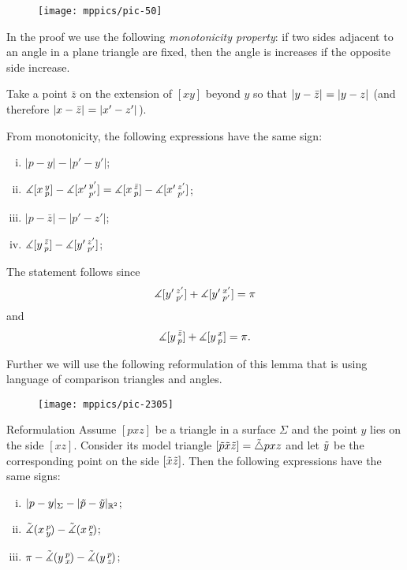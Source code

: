\begin{figure}[h!]
\vskip-0mm
\centering
\texttt{[image: mppics/pic-50]}
\vskip-0mm
\end{figure}

In the proof we use the following \emph{monotonicity property}:
if two sides adjacent to an angle in a plane triangle are fixed, 
then the angle is increases if the opposite side increase.

Take 
a point $\bar z$ on the extension of 
$[xy]$ beyond $y$ so that $\dist{y}{\bar z}{}=\dist{y}{z}{}$ (and therefore $\dist{x}{\bar z}{}=\dist{x'}{z'}{}$). 
 
From monotonicity, 
the following expressions have the same sign:
\begin{enumerate}[(i)]
\item $|p-y|-|p'-y'|$;
\item $\measuredangle\hinge{x}{y}{p}-\measuredangle\hinge{x'}{y'}{p'}=\measuredangle\hinge{x}{\bar z}{p}-\measuredangle\hinge{x'}{z'}{p'}$;
\item $|p-\bar z|-|p'-z'|$;
\item $\measuredangle\hinge{y}{\bar z}{p}-\measuredangle\hinge{y'}{z'}{p'}$;
\end{enumerate}
The statement follows since
\[\measuredangle\hinge{y'}{z'}{p'}+\measuredangle\hinge{y'}{x'}{p'}=\pi\]
and
\[\measuredangle\hinge{y}{\bar z}{p}+\measuredangle\hinge{y}{x}{p}=\pi.\]
\qedsf

Further we will use the following reformulation of this lemma that is using language of comparison triangles and angles.

\begin{wrapfigure}{r}{25mm}
\vskip-0mm
\centering
\texttt{[image: mppics/pic-2305]}
\end{wrapfigure}

\begin{thm}{Reformulation}\label{lem:alex-reformulation}
\label{lem:alex}
Assume $[pxz]$ be a triangle in a surface $\Sigma$ and 
the point $y$ lies on the side $[xz]$.
Consider its model triangle $[\~p\~x\~z]=\~\triangle pxz$ and let $\~y$ be the corresponding point on the side $[\~x\~z]$.
Then the following expressions have the same signs:
\begin{enumerate}[(i)]
 \item $|p-y|_\Sigma-|\~p-\~y|_{\RR^2}$;
 \item $\angk xpy-\angk {x}{p}{z}$;
 \item $\pi-\angk ypx-\angk ypz$;
\end{enumerate}
\end{thm}

